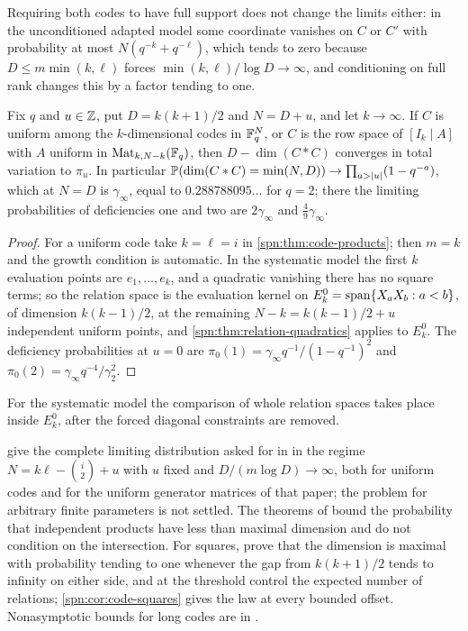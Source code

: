 Requiring both codes to have full support does not change the limits either: in the unconditioned
adapted model some coordinate vanishes on $C$ or $C'$ with probability at most $N(q^{-k}+q^{-\ell})$,
which tends to zero because $D\le m\min(k,\ell)$ forces $\min(k,\ell)/\log D\to\infty$, and conditioning
on full rank changes this by a factor tending to one.

\begin{corollary}\label{spn:cor:code-squares}
Fix $q$ and $u\in\mathbb{Z}$, put $D=k(k+1)/2$ and $N=D+u$, and let $k\to\infty$. If $C$ is uniform among the
$k$-dimensional codes in $\mathbb{F}_q^N$, or $C$ is the row space of $[I_k\mid A]$ with $A$ uniform in
$\operatorname{Mat}_{k,N-k}(\mathbb{F}_q)$, then $D-\dim(C*C)$ converges in total variation to $\pi_u$. In particular
$\mathbb{P}(\dim(C*C)=\min(N,D))\to\prod_{a>\lvert u\rvert}(1-q^{-a})$, which at $N=D$ is $\gamma_\infty$, equal to
$0.288788095\ldots$ for $q=2$; there the limiting probabilities of deficiencies one and two are
$2\gamma_\infty$ and $\frac49\gamma_\infty$.
\end{corollary}

\begin{proof}
For a uniform code take $k=\ell=i$ in \cref{spn:thm:code-products}; then $m=k$ and the growth condition
is automatic. In the systematic model the first $k$ evaluation points are $e_1,\dots,e_k$, and a
quadratic vanishing there has no square terms; so the relation space is the evaluation kernel on
$E_k^0=\operatorname{span}\{X_aX_b:a<b\}$, of dimension $k(k-1)/2$, at the remaining $N-k=k(k-1)/2+u$
independent uniform points, and \cref{spn:thm:relation-quadratics} applies to $E_k^0$. The deficiency
probabilities at $u=0$ are $\pi_0(1)=\gamma_\infty q^{-1}/(1-q^{-1})^2$ and
$\pi_0(2)=\gamma_\infty q^{-4}/\gamma_2^2$.
\end{proof}

For the systematic model the comparison of whole relation spaces takes place inside $E_k^0$, after the
forced diagonal constraints are removed.

\begin{remark}\label{spn:rem:code-literature}
 give the complete limiting distribution asked for
in \cite[Problem~21]{Randriambololona2015Linear} in the regime $N=k\ell-\binom i2+u$ with $u$ fixed and
$D/(m\log D)\to\infty$, both for uniform codes and for the uniform generator matrices of that paper;
the problem for arbitrary finite parameters is not settled. The theorems of
\cite{Randriambololona2015Linear} bound the probability that independent products have less than
maximal dimension and do not condition on the intersection. For squares, \cite{Cascudo2015Squares}
prove that the dimension is maximal with probability tending to one whenever the gap from $k(k+1)/2$
tends to infinity on either side, and at the threshold control the expected number of relations;
\cref{spn:cor:code-squares} gives the law at every bounded offset. Nonasymptotic bounds for long codes
are in \cite{Chizhov2025Nonasymptotic}.
\end{remark}

